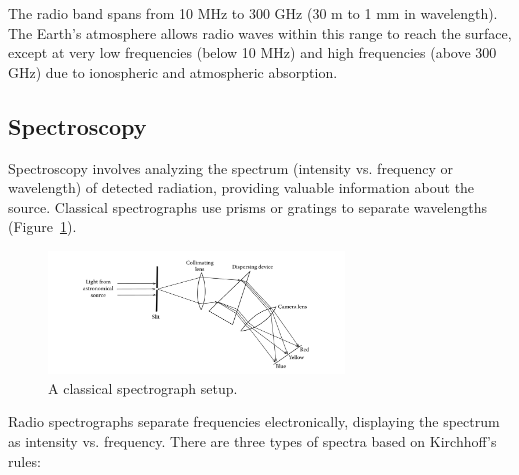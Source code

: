 The radio band spans from 10 MHz to 300 GHz (30 m to 1 mm in wavelength). The Earth's atmosphere allows radio waves within this range to reach the surface, except at very low frequencies (below 10 MHz) and high frequencies (above 300 GHz) due to ionospheric and atmospheric absorption.

\subsection{Spectroscopy}

Spectroscopy involves analyzing the spectrum (intensity vs. frequency or wavelength) of detected radiation, providing valuable information about the source. Classical spectrographs use prisms or gratings to separate wavelengths (Figure~\ref{fig:spectrograph}).

\begin{figure}[H]
    \centering
    \includegraphics[width=0.7\textwidth]{Images/spectrograph.png}
    \caption{A classical spectrograph setup.}
    \label{fig:spectrograph}
\end{figure}

Radio spectrographs separate frequencies electronically, displaying the spectrum as intensity vs. frequency. There are three types of spectra based on Kirchhoff’s rules:


